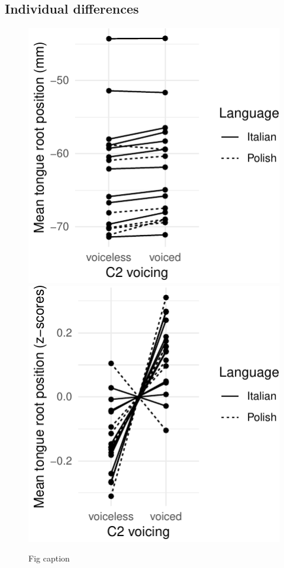 \documentclass[12pt,]{article}
\begin{document}
\subsection{Individual differences}\label{individual-differences}

\begin{figure}

{\centering \includegraphics[width=.49\linewidth]{2018-tra_files/figure-latex/trp-voicing-plot-1} \includegraphics[width=.49\linewidth]{2018-tra_files/figure-latex/trp-voicing-plot-2} 

}

\caption{Fig caption}\label{f:trp-voicing-plot}
\end{figure}
\end{document}
